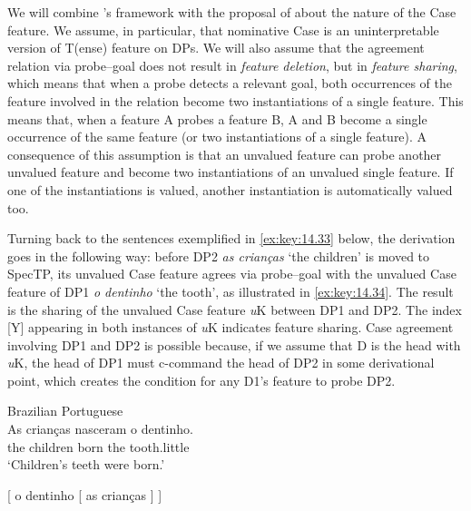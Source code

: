 \documentclass[output=paper]{langsci/langscibook}
\begin{document}
We will combine \citet{Chomsky2008}’s framework with the proposal of
\citet{PesTor2004} about the nature of the Case feature. We assume, in
particular, that nominative Case is an uninterpretable
version of T(ense) feature on DPs. We will also assume that the agreement
relation via probe--goal does not result in \emph{feature deletion}, but in
\emph{feature sharing}, which means that when a probe detects a relevant goal,
both occurrences of the feature involved in the relation become two
instantiations of a single feature.  This means that, when a feature A probes a
feature B, A and B become a single occurrence of the same feature (or two
instantiations of a single feature). A consequence of this assumption is that
an unvalued feature can probe another unvalued feature and become two
instantiations of an unvalued single feature.  If one of the instantiations is
valued, another instantiation is automatically valued too.

Turning back to the sentences exemplified in \eqref{ex:key:14.33} below, the
derivation goes in the following way: before DP2 \emph{as crianças} ‘the
children’ is moved to SpecTP, its unvalued Case feature agrees via probe--goal
with the unvalued Case feature of DP1 \emph{o dentinho} ‘the tooth’, as
illustrated in \eqref{ex:key:14.34}. The result is the sharing of the unvalued Case
feature \emph{u}K between DP1 and DP2. The index [Y] appearing in both
instances of \emph{u}K indicates feature sharing. Case agreement involving DP1
and DP2 is possible because, if we assume that D is the head with \emph{u}K,
the head of DP1 must c-command the head of DP2 in some derivational point,
which creates the condition for any D1’s feature to probe DP2.\largerpage[1]

\ea%
    \label{ex:key:14.33}Brazilian Portuguese\\
    \gll    As crianças nasceram o dentinho.\\
            the children born the tooth.little\\
    \glt    ‘Children’s teeth were born.’
\z

\ea%
    \label{ex:key:14.34}
    {}[ o dentinho [ as crianças ] ]
\z
\end{document}
